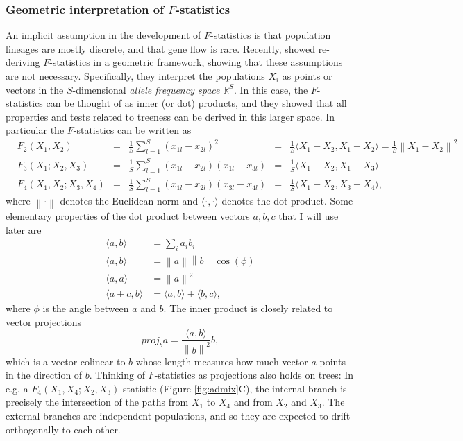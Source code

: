 \documentclass[12pt,fullpage, a4paper]{article}
\newcommand{\norm}[1]{\left\lVert#1\right\rVert}
\newcommand{\normsq}[1]{\left\lVert#1\right\rVert^2}
\newcommand{\vectorproj}[2][]{\textit{proj}_{#1}#2}
\begin{document}
\subsubsection{Geometric interpretation of $F$-statistics}
An implicit assumption in the development of $F$-statistics is that population lineages are mostly discrete, and that gene flow is rare. Recently, \cite{oteo-garcia2021} showed re-deriving $F$-statistics in a geometric framework, showing that these assumptions are not necessary. Specifically, they interpret the populations $X_i$ as points or vectors in the $S$-dimensional \emph{allele frequency space} $\mathbb{R}^S$. In this case, the $F$-statistics can be thought of as inner (or dot) products, and they showed that all properties and tests related to treeness can be derived in this larger space. In particular the $F$-statistics can be written as
\begin{subequations}
	\begin{align}
	&F_2(X_1, X_2) &=& \frac{1}{S}\sum_{l=1}^S(x_{1l} - x_{2l})^2
	&=& \frac{1}{S}\langle X_1 - X_2, X_1 - X_2 \rangle = \frac{1}{S}\normsq{X_1-  X_2}\\
	&F_3(X_1; X_2, X_3) &=& \frac{1}{S}\sum_{l=1}^S(x_{1l} - x_{2l})(x_{1l} - x_{3l}) &=& \frac{1}{S}\langle X_1 - X_2, X_1 - X_3 \rangle\\	
	&F_4(X_1, X_2; X_3, X_4) &=& \frac{1}{S}\sum_{l=1}^S(x_{1l} - x_{2l})(x_{3l} - x_{4l}) &=& \frac{1}{S}\langle X_1 - X_2, X_3 - X_4 \rangle	\text{,}
	\end{align}
\end{subequations}
where $\norm{\cdot}$ denotes the Euclidean norm and $\langle \cdot, \cdot \rangle$ denotes the dot product. Some elementary properties of the dot product between vectors $a, b, c$ that I will use later are
\begin{subequations}
	\begin{align}
	\langle a, b \rangle &= \sum_i a_ib_i\\
	\langle a, b \rangle &= \norm{a}\norm{b}\cos(\phi)\\
	\langle a, a \rangle &= \normsq{a}\\
	\langle a + c, b \rangle &= \langle a, b \rangle + \langle b, c \rangle,
	\end{align}
\end{subequations}
where $\phi$ is the angle between $a$ and $b$. The inner product is  closely related to vector projections
\begin{equation}
\vectorproj[b]{a} = \frac{\langle a , b\rangle}{\normsq{b}} b,\label{eq:proj}
\end{equation}
which is a vector colinear to $b$ whose length measures how much vector $a$ points in the direction of $b$. Thinking of $F$-statistics as projections also holds on trees: In e.g. a $F_4(X_1, X_4; X_2, X_3)$-statistic (Figure \ref{fig:admix}C), the internal branch is precisely the intersection of the paths from $X_1$ to $X_4$ and from $X_2$ and $X_3$. The external branches are independent populations, and so they are expected to drift orthogonally to each other.
\end{document}
